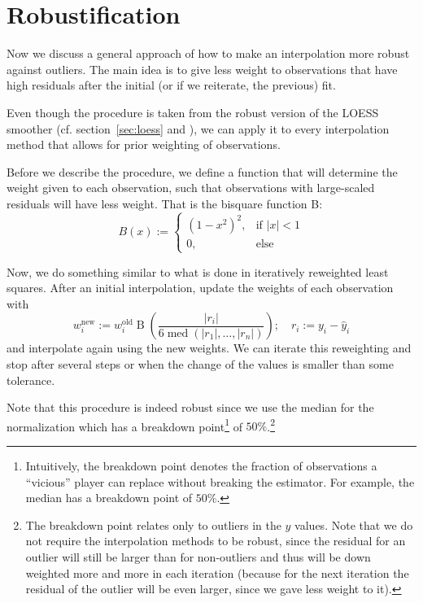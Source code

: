 \section{Robustification}{
	\label{sec:loess_robustify}
	{ %
		Now we discuss a general approach of how to make an interpolation more robust against outliers. The main idea is to give less weight to observations that have high residuals after the initial (or if we reiterate, the previous) fit.

		Even though the procedure is taken from the robust version of the LOESS smoother (cf. section~\ref{sec:loess} and \cite{clevelandRobustLocallyWeighted1979}), we can apply it to every interpolation method that allows for prior weighting of observations.
	}
	
	{	
		Before we describe the procedure, we define a function that will determine the weight given to each observation, such that observations with large-scaled residuals will have less weight. That is the bisquare function B:
		$$
			B(x):=\begin{cases}
				\left(1-x^{2}\right)^{2}, & \text{if } |x|<1 \\
				0,                        & \text{else }
			\end{cases}
		$$

		Now, we do something similar to what is done in iteratively reweighted least squares. After an initial interpolation, update the weights of each observation with
		\begin{equation}
			w_i^\text{new}:=w_i^\text{old} \operatorname{B}\left(\frac{|r_i|}{6\operatorname{med}\left(|r_1|,\dots,|r_n|\right)}\right);\quad
			r_i := y_i - \hat y_i
			\label{eq:bisquare}
		\end{equation}
		and interpolate again using the new weights. We can iterate this reweighting and stop after several steps or when the change of the values is smaller than some tolerance.
	}

	Note that this procedure is indeed robust since we use the median for the normalization which has a breakdown point\footnote{Intuitively, the breakdown point denotes the fraction of observations a ``vicious'' player can replace without breaking the estimator. For example, the median has a breakdown point of $50 \%$.} of $50 \%$.\footnote{The breakdown point relates only to outliers in the $y$ values. Note that we do not require the interpolation methods to be robust, since the residual for an outlier will  still be larger than for non-outliers and thus will be down weighted more and more in each iteration (because for the next iteration the residual of the outlier will be even larger, since we gave less weight to it).}
}
